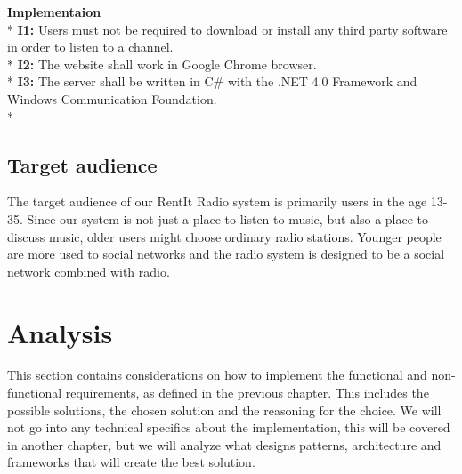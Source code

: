 \documentclass[a4paper,11pt,report]{article}
\begin{document}
{\textbf{Implementaion} \\*
\textbf{I1:} Users must not be required to download or install any third party software in order to listen to a channel. \\*
\textbf{I2:} The website shall work in Google Chrome browser. \\*
\textbf{I3:} The server shall be written in C\# with the .NET 4.0 Framework and Windows Communication Foundation. \\*

\subsection{Target audience}
The target audience of our RentIt Radio system is primarily users in the age 13-35. Since our system is not just a place to listen to music, but also a place to discuss music,  older users might choose ordinary radio stations. Younger people are more used to social networks and the radio system is designed to be a social network combined with radio.

\section{Analysis}
This section contains considerations on how to implement the functional and non-functional requirements, as defined in the previous chapter. This includes the possible solutions, the chosen solution and the reasoning for the choice. We will not go into any technical specifics about the implementation, this will be covered in another chapter, but we will analyze what designs patterns, architecture and frameworks that will create the best solution. 

}
\end{document}
